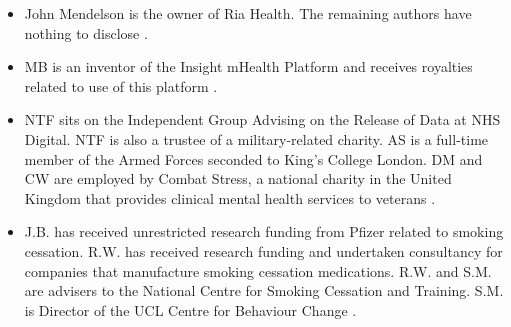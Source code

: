 \begin{itemize}
  \item John Mendelson is the owner of Ria Health. The remaining authors have nothing to disclose \cite{Mitchell2020297}.
  \item MB is an inventor of the Insight mHealth Platform and receives royalties related to use of this platform \cite{Businelle2020}.
  \item NTF sits on the Independent Group Advising on the Release of Data at NHS Digital. NTF is also a trustee of a military-related charity. AS is a full-time member of the Armed Forces seconded to King’s College London. DM and CW are employed by Combat Stress, a national charity in the United Kingdom that provides clinical mental health services to veterans \cite{Leightley2020}.
  \item J.B. has received unrestricted research funding from Pfizer related to smoking cessation. R.W. has received research funding and undertaken consultancy for companies that manufacture smoking cessation medications. R.W. and S.M. are advisers to the National Centre for Smoking Cessation and Training. S.M. is Director of the UCL Centre for Behaviour Change \cite{Garnett2019296}.
\end{itemize}

\newpage
